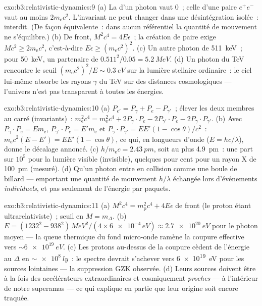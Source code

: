 \begin{solution}{exo:b3:relativistic-dynamics:9}
(a) La  d'un photon vaut $0$~; celle d'une paire
$e^+e^-$ vaut au moins $2m_{\text{e}}c^2$. L'invariant ne peut changer
dans une désintégration isolée~: interdit. (De façon équivalente~:
dans aucun référentiel la quantité de mouvement ne s'équilibre.) (b)
De front, $M^2c^4 = 4E\epsilon$~; la création de paire exige $Mc^2 \ge
2m_{\text{e}}c^2$, c'est-à-dire $E\epsilon \ge (m_{\text{e}}c^2)^2$. (c)
Un autre photon de \qty{511}{keV}~; pour \qty{50}{keV}, un partenaire de
$0.511^2/0.05 = \qty{5.2}{MeV}$. (d) Un photon du TeV rencontre le
seuil $(m_{\text{e}}c^2)^2/E \sim \qty{0.3}{eV}$ sur la lumière
stellaire ordinaire~: le ciel lui-même absorbe les rayons $\gamma$ du
TeV sur des distances cosmologiques --- l'univers n'est pas transparent
à toutes les énergies.
\end{solution}

\begin{solution}{exo:b3:relativistic-dynamics:10}
(a) $P_{e'} = P_\gamma + P_e - P_{\gamma'}$~; élever les deux membres
au carré (invariants)~: $m_{\text{e}}^2c^4 = m_{\text{e}}^2c^4 + 2P_\gamma\!
\cdot\!P_e - 2P_{\gamma'}\!\cdot\!P_e - 2P_\gamma\!\cdot\!P_{\gamma'}$.
(b) Avec $P_\gamma\!\cdot\!P_e = E m_{\text{e}}$,
$P_{\gamma'}\!\cdot\!P_e = E'm_{\text{e}}$ et $P_\gamma\!\cdot\!
P_{\gamma'} = EE'(1 - \cos\theta)/c^2$~:
$m_{\text{e}}c^2(E - E') = EE'(1 - \cos\theta)$, ce qui, en longueurs
d'onde ($E = hc/\lambda$), donne le décalage annoncé. (c) $h/m_{\text{e}}c =
\qty{2.43}{pm}$, soit au plus \qty{4.9}{pm}~: une part sur $10^5$ pour
la lumière visible (invisible), quelques pour cent pour un rayon X de
\qty{100}{pm} (mesuré). (d) Qu'un photon entre en collision comme une
boule de billard --- emportant une quantité de mouvement $h/\lambda$
échangée lors d'événements \emph{individuels}, et pas seulement de
l'énergie par paquets.
\end{solution}

\begin{solution}{exo:b3:relativistic-dynamics:11}
(a) $M^2c^4 = m_{\text{p}}^2c^4 + 4E\epsilon$ de front (le proton étant
ultrarelativiste)~; seuil en $M = m_\Delta$. (b) $E =
(1232^2 - 938^2)\,\unit{MeV^2}/(4 \times \num{6e-4}\,\unit{eV})
\approx \qty{2.7e20}{eV}$ pour le photon moyen --- la queue thermique
du fond micro-onde ramène la coupure effective vers
$\sim\qty{6e19}{eV}$. (c) Les protons au-dessus de la coupure cèdent de
l'énergie au $\Delta$ en $\sim\qty{e8}{ly}$~: le spectre devrait
s'achever vers \qty{6e19}{eV} pour les sources lointaines --- la
suppression GZK observée. (d) Leurs sources doivent être à la fois des
accélérateurs extraordinaires et cosmiquement \emph{proches} ---
à l'intérieur de notre superamas --- ce qui explique en partie que leur
origine soit encore traquée.
\end{solution}

